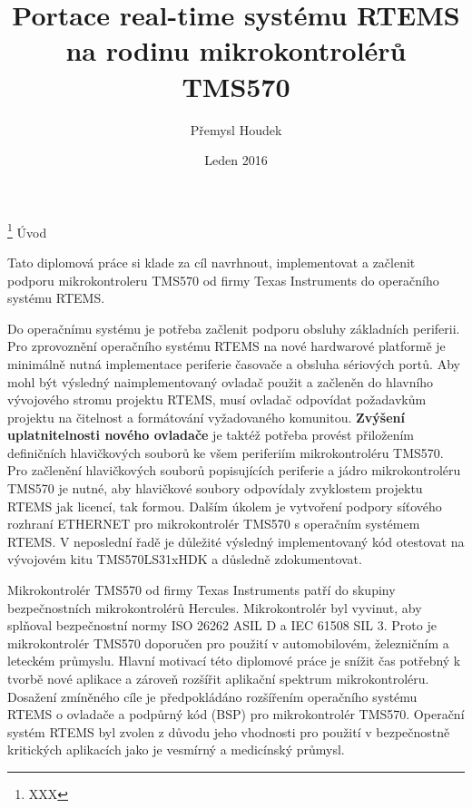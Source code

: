 

\worktype [M/CZ]
\title {Portace real-time systému RTEMS na rodinu mikrokontrolérů TMS570}
\author {Přemysl Houdek}
\date {Leden 2016}
\thanks {XXX}
{}
\makefront
\chap Úvod

Tato diplomová práce si klade za cíl navrhnout, implementovat a začlenit podporu mikrokontroleru TMS570 od firmy Texas Instruments do operačního systému RTEMS.

Do operačnímu systému je potřeba začlenit podporu obsluhy základních periferii.
Pro zprovoznění operačního systému RTEMS na nové hardwarové platformě je minimálně nutná implementace periferie časovače a obsluha sériových portů.
Aby mohl být výsledný naimplementovaný ovladač použit a začleněn do hlavního vývojového stromu projektu RTEMS, musí ovladač odpovídat požadavkům projektu na čitelnost a formátování vyžadovaného komunitou.
{\bf Zvýšení uplatnitelnosti nového ovladače } je taktéž potřeba provést přiložením definičních hlavičkových souborů ke všem periferiím mikrokontroléru TMS570.
Pro začlenění hlavičkových souborů popisujících periferie a jádro mikrokontroléru TMS570 je nutné, aby hlavičkové soubory odpovídaly zvyklostem projektu RTEMS jak licencí, tak formou.
Dalším úkolem je vytvoření podpory síťového rozhraní ETHERNET pro mikrokontrolér TMS570 s operačním systémem RTEMS.
V neposlední řadě je důležité výsledný implementovaný kód otestovat na vývojovém kitu TMS570LS31xHDK a důsledně zdokumentovat.

\medskip

Mikrokontrolér TMS570 od firmy Texas Instruments patří do skupiny bezpečnostních mikrokontrolérů Hercules.
Mikrokontrolér byl vyvinut, aby splňoval bezpečnostní normy ISO 26262 ASIL D a IEC 61508 SIL 3.
Proto je mikrokontrolér TMS570 doporučen pro použití v automobilovém, železničním a leteckém průmyslu.
Hlavní motivací této diplomové práce je snížit čas potřebný k tvorbě nové aplikace a zároveň rozšířit aplikační spektrum mikrokontroléru.
Dosažení zmíněného cíle je předpokládáno rozšířením operačního systému RTEMS o ovladače a podpůrný kód (BSP) pro mikrokontrolér TMS570.
Operační systém RTEMS byl zvolen z důvodu jeho vhodnosti pro použití v bezpečnostně kritických aplikacích jako je vesmírný a medicínský průmysl.

